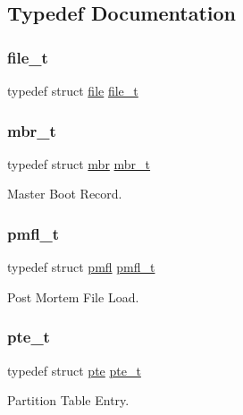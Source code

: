 \subsection{Typedef Documentation}
\mbox{\label{a00191_aa5445a6474a23ee3e7756d432dfa4ba1_aa5445a6474a23ee3e7756d432dfa4ba1}} 
\subsubsection{\texorpdfstring{file\+\_\+t}{file\_t}}
{\footnotesize\ttfamily typedef struct \hyperlink{a00308}{file}  \hyperlink{a00191_aa5445a6474a23ee3e7756d432dfa4ba1_aa5445a6474a23ee3e7756d432dfa4ba1}{file\+\_\+t}}

\mbox{\label{a00191_adb8ab3f846ea25ce3271bfabb17fc767_adb8ab3f846ea25ce3271bfabb17fc767}} 
\subsubsection{\texorpdfstring{mbr\+\_\+t}{mbr\_t}}
{\footnotesize\ttfamily typedef struct \hyperlink{a00316}{mbr}  \hyperlink{a00191_adb8ab3f846ea25ce3271bfabb17fc767_adb8ab3f846ea25ce3271bfabb17fc767}{mbr\+\_\+t}}



Master Boot Record. 

\mbox{\label{a00191_a02f7eedc7de6c770b6b29a62905fc61d_a02f7eedc7de6c770b6b29a62905fc61d}} 
\subsubsection{\texorpdfstring{pmfl\+\_\+t}{pmfl\_t}}
{\footnotesize\ttfamily typedef struct \hyperlink{a00320}{pmfl}  \hyperlink{a00191_a02f7eedc7de6c770b6b29a62905fc61d_a02f7eedc7de6c770b6b29a62905fc61d}{pmfl\+\_\+t}}



Post Mortem File Load. 

\mbox{\label{a00191_aeef6bb6b6bbfd4d912338e1e5c6938a5_aeef6bb6b6bbfd4d912338e1e5c6938a5}} 
\subsubsection{\texorpdfstring{pte\+\_\+t}{pte\_t}}
{\footnotesize\ttfamily typedef struct \hyperlink{a00312}{pte}  \hyperlink{a00191_aeef6bb6b6bbfd4d912338e1e5c6938a5_aeef6bb6b6bbfd4d912338e1e5c6938a5}{pte\+\_\+t}}



Partition Table Entry. 

